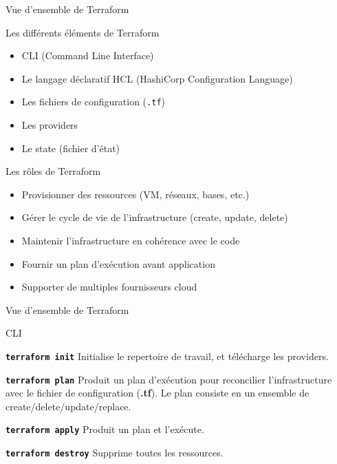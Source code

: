 \documentclass[aspectratio=169,10pt]{beamer}
\begin{document}
\begin{frame}{Vue d'ensemble de Terraform}

Les différents éléments de Terraform

\begin{itemize}
    \item CLI (Command Line Interface)
    \item Le langage déclaratif HCL (HashiCorp Configuration Language)
    \item Les fichiers de configuration (\texttt{.tf})
    \item Les providers
    \item Le state (fichier d'état)
\end{itemize}

\begin{alertblock}{Les rôles de Terraform}
    \begin{itemize}
    \item Provisionner des ressources (VM, réseaux, bases, etc.)
    \item Gérer le cycle de vie de l'infrastructure (create, update, delete)
    \item Maintenir l'infrastructure en cohérence avec le code
    \item Fournir un plan d'exécution avant application
    \item Supporter de multiples fournisseurs cloud
    \end{itemize}
\end{alertblock}

\end{frame}
\begin{frame}{Vue d'ensemble de Terraform}

\end{frame}

\begin{frame}{CLI}

\begin{block}{\texttt{\textbf{terraform init}}}
\alert{Initialise} le repertoire de travail, et \alert{télécharge} les providers.
\end{block}
\pause

\begin{block}{\texttt{\textbf{terraform plan}}}
Produit un \alert{plan} d'exécution pour reconcilier l'infrastructure avec le fichier de configuration (\textbf{.tf}). Le plan consiste en un ensemble de create/delete/update/replace.
\end{block}
\pause

\begin{block}{\texttt{\textbf{terraform apply}}}
Produit un plan et l'\alert{exécute}.
\end{block}
\pause

\begin{block}{\texttt{\textbf{terraform destroy}}}
\alert{Supprime} toutes les ressources.
\end{block}

\end{frame}
\end{document}

